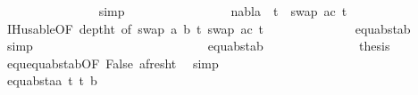 \begin{isabellebody}
\ \ \ \ \ \ \ \ \ \ \ \ \ \ \isamarkupfalse%
\ simp\isanewline
\isanewline
\ \ \ \ \ \ \ \ \ \ \ \ \isamarkupfalse%
\ {}{\isacharparenleft}{\kern0pt}{}{\isacharcomma}{\kern0pt}{}{\isacharcomma}{\kern0pt}{}{\isacharparenright}{\kern0pt}\ \isamarkupfalse%
\ {\isachardoublequoteopen}nabla\ {\isasymturnstile}\ t{}{\isacharprime}{\kern0pt}\ {\isasymapprox}\ swap\ {\isacharbrackleft}{\kern0pt}{\isacharparenleft}{\kern0pt}a{\isacharcomma}{\kern0pt}c{\isacharparenright}{\kern0pt}{\isacharbrackright}{\kern0pt}\ t{}{\isacharprime}{\kern0pt}{\isachardoublequoteclose}\isanewline
\ \ \ \ \ \ \ \ \ \ \ \ \ \ \isamarkupfalse%
\ IH{\isacharunderscore}{\kern0pt}usable{\isacharbrackleft}{\kern0pt}OF\ deptht{}{\isacharcomma}{\kern0pt}\ of\ {\isacartoucheopen}swap\ {\isacharbrackleft}{\kern0pt}{\isacharparenleft}{\kern0pt}a{\isacharcomma}{\kern0pt}\ b{\isacharparenright}{\kern0pt}{\isacharbrackright}{\kern0pt}\ t{}{\isacharprime}{\kern0pt}{\isacartoucheclose}\ {\isacartoucheopen}swap\ {\isacharbrackleft}{\kern0pt}{\isacharparenleft}{\kern0pt}a{\isacharcomma}{\kern0pt}c{\isacharparenright}{\kern0pt}{\isacharbrackright}{\kern0pt}\ t{}{\isacharprime}{\kern0pt}{\isacartoucheclose}{\isacharbrackright}{\kern0pt}\isanewline
\ \ \ \ \ \ \ \ \ \ \ \ \ \ equ{\isacharunderscore}{\kern0pt}abst{\isacharunderscore}{\kern0pt}ab{\isacharparenleft}{\kern0pt}{}{\isacharparenright}{\kern0pt}\ \isamarkupfalse%
\ simp\isanewline
\ \ \ \ \ \ \ \ \ \ \ \ \isanewline
\ \ \ \ \ \ \ \ \ \ \ \ \isamarkupfalse%
\ {}{\isacharparenleft}{\kern0pt}{}{\isacharcomma}{\kern0pt}{}{\isacharparenright}{\kern0pt}\ equ{\isacharunderscore}{\kern0pt}abst{\isacharunderscore}{\kern0pt}ab{\isacharparenleft}{\kern0pt}{}{\isacharparenright}{\kern0pt}\ \isanewline
\ \ \ \ \ \ \ \ \ \ \ \ \isamarkupfalse%
\ {\isacharquery}{\kern0pt}thesis\ \isamarkupfalse%
\ equ{\isachardot}{\kern0pt}equ{\isacharunderscore}{\kern0pt}abst{\isacharunderscore}{\kern0pt}ab{\isacharbrackleft}{\kern0pt}OF\ False\ a{\isacharunderscore}{\kern0pt}fresh{\isacharunderscore}{\kern0pt}t{}{\isacharbrackright}{\kern0pt}\ \isamarkupfalse%
\ simp\isanewline
\ \ \ \ \ \ \ \ \ \isamarkupfalse%
\isanewline
\ \ \ \ \ \ \ \isamarkupfalse%
\isanewline
\ \ \ \ \ \ \ \ \ \isamarkupfalse%
\ {\isacharparenleft}{\kern0pt}equ{\isacharunderscore}{\kern0pt}abst{\isacharunderscore}{\kern0pt}aa\ t{}{\isacharprime}{\kern0pt}\ t{}{\isacharprime}{\kern0pt}\ b{\isacharparenright}{\kern0pt}\isanewline

\end{isabellebody}

